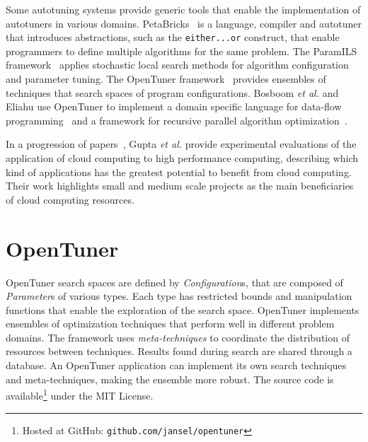 \documentclass[a4paper, 12pt]{article}
\begin{document}
Some autotuning systems provide generic tools that enable the implementation of
autotuners in various domains. PetaBricks~\cite{ansel2009petabricks} is a
language, compiler and autotuner that introduces abstractions, such as the
\texttt{\footnotesize either...or} construct, that enable programmers to define
multiple algorithms for the same problem.  The ParamILS
framework~\cite{hutter2009paramils} applies stochastic local search methods
for algorithm configuration and parameter tuning.  The OpenTuner
framework~\cite{ansel2014opentuner} provides ensembles of techniques that
search spaces of program configurations. Bosboom \emph{et al.} and Eliahu use
OpenTuner to implement a domain specific language for data-flow
programming~\cite{bosboom2014streamjit} and a framework for recursive parallel
algorithm optimization~\cite{eliahu2015frpa}.

In a progression of papers~\cite{gupta2012exploring,gupta2014evaluating,gupta2013hpccloud},
Gupta \emph{et al.} provide experimental evaluations of the application of
cloud computing to high performance computing, describing which kind of
applications has the greatest potential to benefit from cloud computing.
Their work highlights small and medium scale projects as the main beneficiaries
of cloud computing resources.


\section{OpenTuner} \label{sec:ot}

OpenTuner search spaces are defined by \emph{Configuration}s, that are composed
of \emph{Parameter}s of various types. Each type has restricted bounds and
manipulation functions that enable the exploration of the search space.
OpenTuner implements ensembles of optimization techniques that
perform well in different problem domains. The framework uses
\emph{meta-techniques} to coordinate the distribution of resources
between techniques.
Results found during search are shared through a
database. An OpenTuner application can implement its own search
techniques and meta-techniques, making the ensemble more robust.
The source code is available\footnote{Hosted at GitHub:
\texttt{\scriptsize github.com/jansel/opentuner}} under the MIT License.
\end{document}
